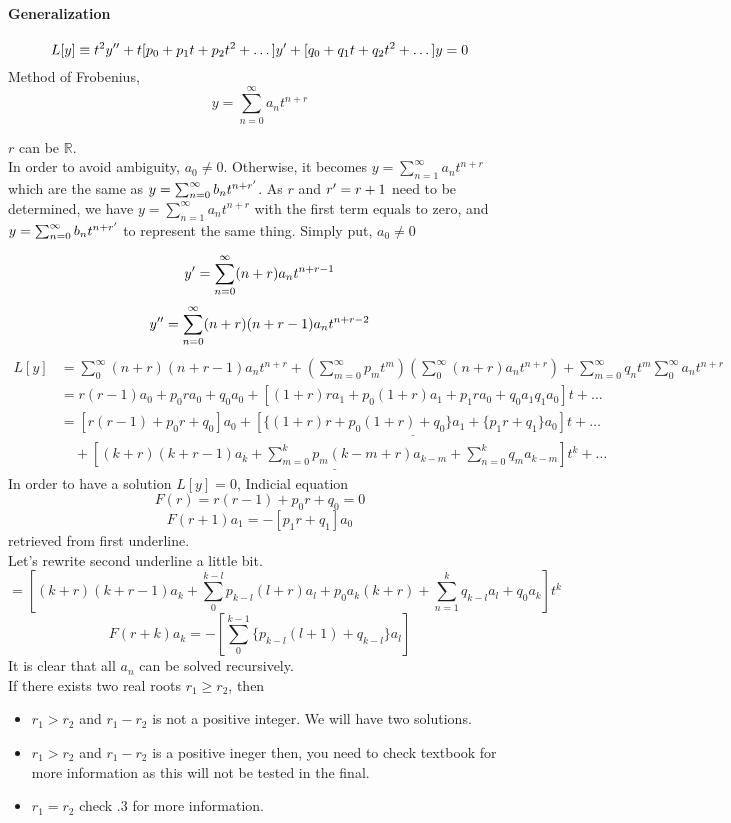 \paragraph{Generalization}
\[L[y]\equiv t^2y^{\prime\prime}+t[p_0+p_1t+p_2t^2+\dots]y^{\prime}+[q_0+q_1t+q_2t^2+\dots]y=0
\]
Method of Frobenius,
\[y=\sum_{n=0}^\infty a_nt^{n+r}
\]
\begin{remark}
$r$ can be $\mathbb{R}$.\\
In order to avoid ambiguity, $a_0\neq 0$. Otherwise, it becomes $y=\sum_{n=1}^\infty a_nt^{n+r}$ which are the same as $y=\sum_{n=0}^{\infty}b_nt^{n+r^{\prime}}$. As $r$ and $r^{\prime}=r+1$ need to be determined, we have $y=\sum_{n=1}^\infty a_nt^{n+r}$ with the first term equals to zero, and $y=\sum_{n=0}^{\infty}b_nt^{n+r^{\prime}}$ to represent the same thing. Simply put, $a_0\neq 0$
\end{remark}
\[y^{\prime}=\sum_{n=0}^\infty(n+r)a_nt^{n+r-1}
\]
\[y^{\prime\prime}=\sum_{n=0}^{\infty}(n+r)(n+r-1)a_nt^{n+r-2}
\]
\[\begin{aligned}L[y]&=\sum_0^\infty(n+r)(n+r-1)a_nt^{n+r}+(\sum_{m=0}^\infty p_mt^m)(\sum_0^\infty (n+r)a_nt^{n+r})+\sum_{m=0}^\infty q_nt^m\sum_0^\infty a_nt^{n+r}\\
&=r(r-1)a_0+p_0ra_0+q_0a_0+[(1+r)ra_1+p_0(1+r)a_1+p_1ra_0+q_0a_1q_1a_0]t+\dots\\
&=[r(r-1)+p_0r+q_0]a_0+\underline{[\{(1+r)r+p_0(1+r)+q_0\}a_1+\{p_1r+q_1\}a_0]t}+\dots\\
&\quad+\underline{[(k+r)(k+r-1)a_k+\sum_{m=0}^kp_m(k-m+r)a_{k-m}+\sum_{n=0}^kq_ma_{k-m}]t^k}+\dots
\end{aligned}
\]
In order to have a solution $L[y]=0$,
Indicial equation
\[F(r)=r(r-1)+p_0r+q_0=0
\]
\[F(r+1)a_1=-[p_1r+q_1]a_0
\]
retrieved from first underline.\\Let's rewrite second underline a little bit.
\[=[(k+r)(k+r-1)a_k+\sum_0^{k-l}p_{k-l}(l+r)a_l+p_0a_k(k+r)+\sum_{n=1}^kq_{k-l}a_l+q_0a_k]t^k
\]
\[F(r+k)a_k=-[\sum_0^{k-1}\{p_{k-l}(l+1)+q_{k-l}\}a_l]
\]
It is clear that all $a_n$ can be solved recursively.\\
If there exists two real roots $r_1\geq r_2$, then 
\begin{itemize}
\item $r_1>r_2$ and $r_1-r_2$ is  not a positive integer. We will have two solutions.
\item $r_1>r_2$ and $r_1-r_2$ is a positive ineger then, you need to check textbook for more information as this will not be tested in the final.
\item $r_1=r_2$ check .3 for more information.
\end{itemize}
